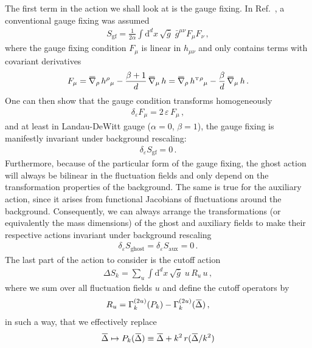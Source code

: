 \documentclass[11pt]{book}
\newcommand{\overbar}[1]{\mkern 1.5mu\overline{\mkern-1.5mu#1\mkern-1.5mu}\mkern 1.5mu}
\newcommand\hT{ h^{\scriptscriptstyle{\mathrm{T}} } }
\newcommand{\bnabla}{\overbar \nabla}
\newcommand{\weyl}{\delta_\varepsilon}
\numberwithin{equation}{chapter}
\begin{document}
The first term in the action we shall look at is the gauge fixing. In Ref.~\cite{Morris:2016spn},
a conventional gauge fixing was assumed
\begin{align}
  S_\mathrm{gf} = \frac{1}{2\alpha} \int \mathrm d^dx \, \sqrt{\bar g} \; \bar g^{\mu\nu} F_\mu F_\nu \,,
\end{align}
where the gauge fixing condition $F_\mu$ is linear in $h_{\mu\nu}$ and only contains terms
with covariant derivatives
\begin{align}
  F_\mu = \bnabla_\rho \, h{}^\rho{}_\mu - \frac{\beta + 1}{d} \, \bnabla_\mu \, h
  = \bnabla_\rho \, \hT{}^\rho{}_\mu - \frac{\beta}{d} \, \bnabla_\mu \, h \,.
\end{align}
One can then show that the gauge condition transforms homogeneously
\begin{align}
  \weyl F_\mu = 2 \, \varepsilon \, F_\mu \,,
\end{align}
and at least in Landau-DeWitt gauge ($\alpha=0$, $\beta=1$), the gauge fixing
is manifestly invariant under background rescaling:
\begin{align}
  \weyl S_\mathrm{gf} = 0 \,.
\end{align}
Furthermore, because of the particular form of the gauge fixing, the ghost action
will always be bilinear in the fluctuation fields and only depend on the transformation
properties of the background. The same is true for the auxiliary action, since it
arises from functional Jacobians of fluctuations around the background. Consequently,
we can always arrange the transformations (or equivalently the mass dimensions)
of the ghost and auxiliary fields to make their respective actions invariant
under background rescaling
\begin{align}
  \weyl S_\mathrm{ghost} = \weyl S_\mathrm{aux} = 0 \,.
\end{align}
The last part of the action to consider is the cutoff action
\begin{align}
  \Delta S_k = \sum_u \int \mathrm d^dx \, \sqrt{\bar g} \; u \, R_u \, u \,,
\end{align}
where we sum over all fluctuation fields $u$ and define the cutoff operators by
\begin{align}
  R_u = \Gamma^{(2u)}_k (P_k) - \Gamma^{(2u)}_k (\overbar \Delta) \,,
\end{align}
in such a way, that we effectively replace
\begin{align}
  \overbar \Delta \mapsto P_k(\overbar \Delta) \equiv \overbar \Delta + k^2 \, r(\overbar\Delta/k^2)
\end{align}
\end{document}
